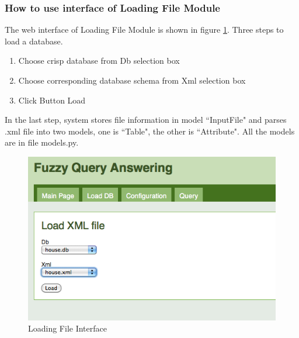 \subsubsection{How to use interface of Loading File Module}
The web interface of Loading File Module is shown in figure \ref{fig:LFI}. Three steps  to load a database.
\begin{enumerate}
\item Choose crisp database from Db selection box
\item Choose corresponding database schema from Xml selection box
\item Click Button Load
\end{enumerate}
In the last step, system stores file information in model ``InputFile" and parses .xml file into two models, one is ``Table", the other is ``Attribute". All the models are in file models.py.
\begin{figure}[htb]
\begin{center}
\leavevmode
\includegraphics[scale=0.7]{LoadFile.png}
\end{center}
\caption{Loading File Interface}
\label{fig:LFI}
\end{figure}




